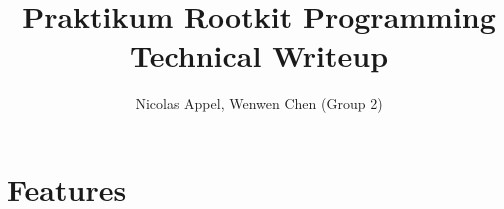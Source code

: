 \documentclass[a4paper,10pt]{report}
\title{Praktikum Rootkit Programming\\Technical Writeup}
\author{Nicolas Appel, Wenwen Chen (Group 2)}
\begin{document}
\maketitle
\clearpage
\tableofcontents
\clearpage

\chapter{Features}













\end{document}
